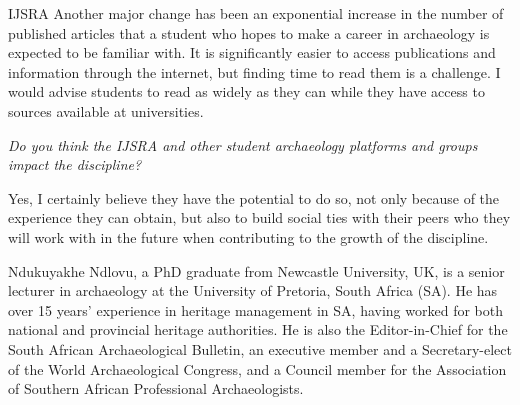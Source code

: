 \begin{labeling}{IJSRA}
Another major change has been an exponential increase in the number of published articles that a student who hopes to make a career in archaeology is expected to be familiar with. It is significantly easier to access publications and information through the internet, but finding time to read them is a challenge. I would advise students to read as widely as they can while they have access to sources available at universities.


\item[IJSRA] \emph{Do you think the IJSRA and other student archaeology platforms and groups impact the discipline?}
	
\item[JD]
Yes, I certainly believe they have the potential to do so, not only because of the experience they can obtain, but also to build social ties with their peers who they will work with in the future when contributing to the growth of the discipline.



\end{labeling}
\IJSRAseparator
{}
{\sffamily Ndukuyakhe Ndlovu, a PhD graduate from Newcastle University, UK, is a senior lecturer in archaeology at the University of Pretoria, South Africa (SA). He has over 15 years’ experience in heritage management in SA, having worked for both national and provincial heritage authorities. He is also the Editor-in-Chief for the South African Archaeological Bulletin, an executive member and a Secretary-elect of the World Archaeological Congress, and a Council member for the Association of Southern African Professional Archaeologists. 
}

